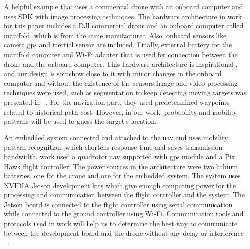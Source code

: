 \documentclass[../main.tex]{subfiles}
\begin{document}

	A helpful example that uses a commercial drone with an onboard computer and uses SDK with image processing techniques.
	The hardware architecture in \citeauthor{Wang18} work for this paper includes a DJI 
	commercial drone and an onboard computer called manifold, which is from the same manufacturer.
	 Also, onboard sensors like camera,\gls{gps} and inertial sensor are included. Finally,
	 external battery for the manifold computer and Wi-Fi adapter that is used for connection 
	 between the drone and the onboard computer. This hardware architecture is inspirational
	 , and our design is somehow close to it with minor changes in the onboard computer and 
	 without the existence of the sensors.Image and video processing techniques were used, such as 
	 segmentation to keep detecting moving targets was presented in ~\cite{Wang18}.
	For the navigation part, they used predetermined waypoints related to historical path cost. 
	However, in our work, probability and mobility patterns will be used to guess the target's location.

    An embedded system connected and attached to the \gls{uav} and uses mobility pattern recognition, which shortens response time and saves transmission bandwidth. 
	\citeauthor{Zhao18} work used a quadrotor \gls{uav} supported with \gls{gps} module and a Pix 
	Hawk flight controller. The power sources in the architecture were two lithium batteries, 
	one for the drone and one for the embedded system. The system uses	NVIDIA Jetson development
	 kits which give enough computing power for the processing and communication between the flight 
	 controller and the system. The Jetson board is connected to the flight controller using serial 
	 communication while connected to the ground controller using Wi-Fi. Communication tools and protocols used in \citeauthor{Zhao18} work 
	  will help us to determine the best way to communicate between the development 
	  board and the drone without any delay or interference ~\cite{Zhao18}. 



\end{document}
